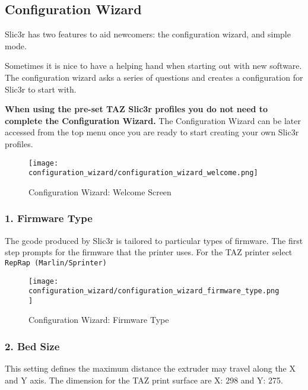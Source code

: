 
\subsection{Configuration Wizard}
\label{sec:configuration_wizard}

Slic3r has two features to aid newcomers: the configuration wizard, and simple mode.

Sometimes it is nice to have a helping hand when starting out with new software.  The configuration wizard asks a series of questions and creates a configuration for Slic3r to start with.

\textbf{When using the pre-set TAZ Slic3r profiles you do not need to complete the Configuration Wizard.} The Configuration Wizard can be later accessed from the top menu once you are ready to start creating your own Slic3r profiles.

\begin{figure}[H]
\centering
\texttt{[image: configuration\_wizard/configuration\_wizard\_welcome.png]}
\caption{Configuration Wizard: Welcome Screen}
\label{fig:configuration_wizard_welcome_screen}
\end{figure}

\newpage
\subsubsection{1. Firmware Type}
\label{sub:1_firmware_type}
The gcode produced by Slic3r is tailored to particular types of firmware.  The first step prompts for the firmware that the printer uses.  For the TAZ printer select \texttt{RepRap (Marlin/Sprinter)}
\begin{figure}[H]
\centering
\texttt{[image: configuration\_wizard/configuration\_wizard\_firmware\_type.png]}
\caption{Configuration Wizard: Firmware Type}
\label{fig:configuration_wizard_firmware_type}
\end{figure}

\newpage
\subsubsection{2. Bed Size}
\label{sub:2_bed_size}
This setting defines the maximum distance the extruder may travel along the X and Y axis.  The dimension for the TAZ print surface are X: 298 and Y: 275.

